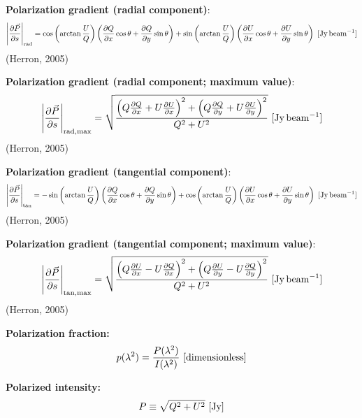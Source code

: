 \documentclass[a4paper,10pt]{article}
\begin{document}
{\noindent}\textbf{Polarization gradient (radial component)}:
\begin{align*}
	\left\lvert\dfrac{\partial\vec{P}}{\partial s}\right\rvert_\mathrm{rad} = \cos\left(\arctan\frac{U}{Q}\right)\left(\frac{\partial Q}{\partial x}\cos\theta+\frac{\partial Q}{\partial y}\sin\theta\right) + \sin\left(\arctan\frac{U}{Q}\right)\left(\frac{\partial U}{\partial x}\cos\theta+\frac{\partial U}{\partial y}\sin\theta\right) ~ [\rm Jy\,beam^{-1}]
\end{align*}
(Herron, 2005)

{\noindent}\textbf{Polarization gradient (radial component; maximum value)}:
\begin{align*}
	\left\lvert\dfrac{\partial\vec{P}}{\partial s}\right\rvert_\mathrm{rad,max} = \sqrt{\frac{\left(Q\frac{\partial Q}{\partial x}+U\frac{\partial U}{\partial x}\right)^2 +\left(Q\frac{\partial Q}{\partial y}+U\frac{\partial U}{\partial y}\right)^2}{Q^2+U^2}} ~ [\rm Jy\,beam^{-1}]
\end{align*}
(Herron, 2005)

{\noindent}\textbf{Polarization gradient (tangential component)}:
\begin{align*}
	\left\lvert\dfrac{\partial\vec{P}}{\partial s}\right\rvert_\mathrm{tan} = -\sin\left(\arctan\frac{U}{Q}\right)\left(\frac{\partial Q}{\partial x}\cos\theta+\frac{\partial Q}{\partial y}\sin\theta\right) + \cos\left(\arctan\frac{U}{Q}\right)\left(\frac{\partial U}{\partial x}\cos\theta+\frac{\partial U}{\partial y}\sin\theta\right) ~ [\rm Jy\,beam^{-1}]
\end{align*}
(Herron, 2005)

{\noindent}\textbf{Polarization gradient (tangential component; maximum value)}:
\begin{align*}
	\left\lvert\dfrac{\partial\vec{P}}{\partial s}\right\rvert_\mathrm{tan,max} = \sqrt{\frac{\left(Q\frac{\partial U}{\partial x}-U\frac{\partial Q}{\partial x}\right)^2 +\left(Q\frac{\partial U}{\partial y}-U\frac{\partial Q}{\partial y}\right)^2}{Q^2+U^2}} ~ [\rm Jy\,beam^{-1}]
\end{align*}
(Herron, 2005)

{\noindent}\textbf{Polarization fraction:}
\begin{align*}
p(\lambda^2) = \dfrac{P(\lambda^2)}{I(\lambda^2)} ~ [{\rm dimensionless}]
\end{align*}

{\noindent}\textbf{Polarized intensity:}
\begin{align*}
    P\equiv\sqrt{Q^2+U^2} ~ [\rm Jy]
\end{align*}
\end{document}

